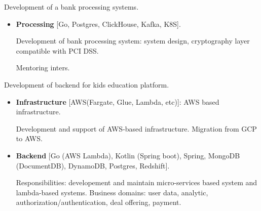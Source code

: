 \documentclass{cv}
\begin{document}
\begin{cvblock}{%
		}

	Development of a bank processing systems.

	\begin{itemize}
		\item \textbf{Processing} [Go, Postgres, ClickHouse, Kafka, K8S].

					Development of bank processing system: system design,
					cryptography layer compatible with PCI DSS.

					Mentoring inters.

	\end{itemize}
\end{cvblock}

\begin{cvblock}{%
		}

	Development of backend for kids education platform.

	\begin{itemize}
		\item \textbf{Infrastructure} [AWS(Fargate, Glue, Lambda, etc)]: AWS based infrastructure.

		      Development and support of AWS-based infrastructure. Migration from GCP to AWS.

		\item \textbf{Backend} [Go (AWS Lambda), Kotlin (Spring boot), Spring, MongoDB (DocumentDB), DynamoDB, Postgres, Redshift].

		      Responsibilities: developement and maintain micro-services based system and lambda-based systems. Business domains:
		      user data, analytic, authorization/authentication, deal offering, payment.
	\end{itemize}
\end{cvblock}
\end{document}
